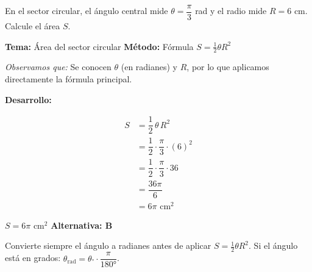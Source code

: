 \begin{tcolorbox}[
  enhanced, breakable,
  colback=GrisClaro, colframe=AzulPizarra,
  fonttitle=\bfseries\sffamily\color{white},
  title={Trigonometría — Ejercicio 1},
  arc=3pt, boxrule=0.8pt
]

\begin{problema}
  En el sector circular, el ángulo central mide $\theta = \dfrac{\pi}{3}$ rad
  y el radio mide $R = 6$ cm. Calcule el área $S$.
\end{problema}

\smallskip
\noindent
\textbf{\sffamily\color{AzulMedio}Tema:} Área del sector circular \hfill
\textbf{\sffamily\color{AzulMedio}Método:} Fórmula $S = \tfrac{1}{2}\theta R^2$

\medskip
\noindent\textit{Observamos que:} Se conocen $\theta$ (en radianes) y $R$, por lo que aplicamos
directamente la fórmula principal.

\noindent\textbf{\sffamily Desarrollo:}

\begin{minipage}{0.35\linewidth}
\centering
{}
\end{minipage}
\hfill
\begin{minipage}{0.60\linewidth}
\begin{align*}
  S &= \dfrac{1}{2}\,\theta\, R^2 \\[6pt]
    &= \dfrac{1}{2} \cdot \dfrac{\pi}{3} \cdot (6)^2 \\[6pt]
    &= \dfrac{1}{2} \cdot \dfrac{\pi}{3} \cdot 36 \\[6pt]
    &= \dfrac{36\pi}{6} \\[6pt]
    &= 6\pi \text{ cm}^2
\end{align*}
\end{minipage}

\begin{tcolorbox}[
  colback=AzulClaro!60, colframe=AzulPizarra,
  arc=2pt, boxrule=0.8pt, left=8pt, right=8pt
]
\centering
$\displaystyle S = 6\pi \text{ cm}^2$
\quad\textbf{Alternativa: B}
\end{tcolorbox}

\begin{cajatip}
Convierte siempre el ángulo a radianes antes de aplicar $S = \tfrac{1}{2}\theta R^2$.
Si el ángulo está en grados: $\theta_{\text{rad}} = \theta_° \cdot \dfrac{\pi}{180°}$.
\end{cajatip}

\end{tcolorbox}


